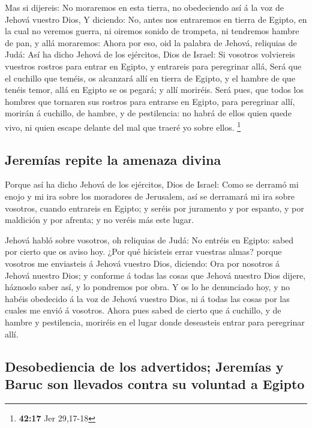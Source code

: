  Mas si dijereis: No moraremos en esta tierra, no
obedeciendo así á la voz de Jehová vuestro Dios,  Y
diciendo: No, antes nos entraremos en tierra de Egipto, en la cual no
veremos guerra, ni oiremos sonido de trompeta, ni tendremos hambre de
pan, y allá moraremos:  Ahora por eso, oid la palabra de
Jehová, reliquias de Judá: Así ha dicho Jehová de los ejércitos, Dios de
Israel: Si vosotros volviereis vuestros rostros para entrar en Egipto, y
entrareis para peregrinar allá,  Será que el cuchillo que
teméis, os alcanzará allí en tierra de Egipto, y el hambre de que tenéis
temor, allá en Egipto se os pegará; y allí moriréis. 
Será pues, que todos los hombres que tornaren sus rostros para entrarse
en Egipto, para peregrinar allí, morirán á cuchillo, de hambre, y de
pestilencia: no habrá de ellos quien quede vivo, ni quien escape delante
del mal que traeré yo sobre ellos. \footnote{\textbf{42:17} Jer 29,17-18}

\hypertarget{jeremuxedas-repite-la-amenaza-divina}{%
\subsection{Jeremías repite la amenaza
divina}\label{jeremuxedas-repite-la-amenaza-divina}}

 Porque así ha dicho Jehová de los ejércitos, Dios de
Israel: Como se derramó mi enojo y mi ira sobre los moradores de
Jerusalem, así se derramará mi ira sobre vosotros, cuando entrareis en
Egipto; y seréis por juramento y por espanto, y por maldición y por
afrenta; y no veréis más este lugar.

 Jehová habló sobre vosotros, oh reliquias de Judá: No
entréis en Egipto: sabed por cierto que os aviso hoy. 
¿Por qué hicisteis errar vuestras almas? porque vosotros me enviasteis á
Jehová vuestro Dios, diciendo: Ora por nosotros á Jehová nuestro Dios; y
conforme á todas las cosas que Jehová nuestro Dios dijere, háznoslo
saber así, y lo pondremos por obra.  Y os lo he
denunciado hoy, y no habéis obedecido á la voz de Jehová vuestro Dios,
ni á todas las cosas por las cuales me envió á vosotros. 
Ahora pues sabed de cierto que á cuchillo, y de hambre y pestilencia,
moriréis en el lugar donde deseasteis entrar para peregrinar allí.

\hypertarget{desobediencia-de-los-advertidos-jeremuxedas-y-baruc-son-llevados-contra-su-voluntad-a-egipto}{%
\subsection{Desobediencia de los advertidos; Jeremías y Baruc son
llevados contra su voluntad a
Egipto}\label{desobediencia-de-los-advertidos-jeremuxedas-y-baruc-son-llevados-contra-su-voluntad-a-egipto}}

